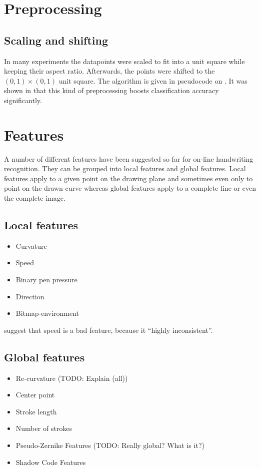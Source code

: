 \section{Preprocessing}
\subsection{Scaling and shifting}
In many experiments the datapoints were scaled to fit into a unit square while
keeping their aspect ratio. Afterwards, the points were shifted to the
$(0, 1) \times (0, 1)$ unit square. The algorithm is given in pseudocode on
. It was shown in \cite{Kirsch,Huang09} that
this kind of preprocessing boosts classification accuracy significantly.

\section{Features}
A number of different features have been suggested so far for on-line handwriting
recognition. They can be grouped into local features and global features.
Local features apply to a given point on the drawing plane and sometimes even
only to point on the drawn curve whereas global features apply to a complete
line or even the complete image.

\subsection{Local features}
\begin{itemize}
    \item Curvature\cite{Manke95}
    \item Speed\cite{Huang09}
    \item Binary pen pressure\cite{Kosmala98,Kosmala11}
    \item Direction\cite{Manke95,Huang06}
    \item Bitmap-environment\cite{Manke95}
\end{itemize}

\cite{Kosmala98,Kosmala11} suggest that speed is a bad feature, because it \enquote{highly inconsistent}.

\subsection{Global features}
\begin{itemize}
    \item Re-curvature\cite{Huang06} (TODO: Explain (all))
    \item Center point\cite{Huang06}
    \item Stroke length\cite{Huang06}
    \item Number of strokes\cite{Huang09}
    \item Pseudo-Zernike Features (TODO: Really global? What is it?)\cite{Khotanzad}
    \item Shadow Code Features\cite{Khotanzad}
\end{itemize}